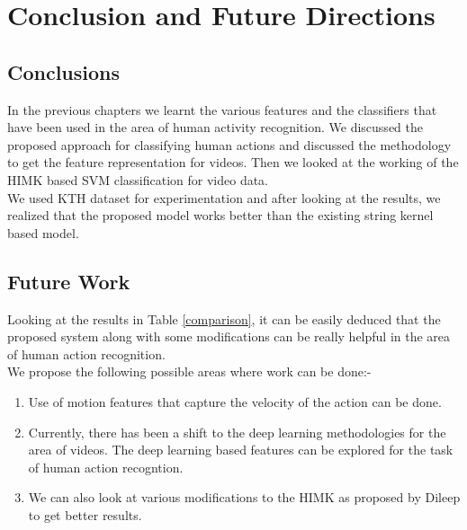 \chapter{Conclusion and Future Directions}\label{Conclusion}
\thispagestyle{empty}
\setlength{\parskip}{10pt plus 5pt minus 3pt}
\setlength{\parindent}{20pt}%

\section{Conclusions}
In the previous chapters we learnt the various features and the classifiers that have been used in the area of human activity recognition. We discussed the proposed approach for classifying human actions and discussed the methodology to get the feature representation for videos. Then we looked at the working of the HIMK based SVM classification for video data.\\
We used KTH dataset for experimentation and after looking at the results, we realized that the proposed model works better than the existing string kernel based model. 

\section{Future Work}
Looking at the results in Table \ref{comparison}, it can be easily deduced that the proposed system along with some modifications can be really helpful in the area of human action recognition.\\
We propose the following possible areas where work can be done:-
\begin{enumerate}
\item Use of motion features that capture the velocity of the action can be done.
\item Currently, there has been a shift to the deep learning methodologies for the area of videos. The deep learning based features can be explored for the task of human action recogntion.
\item We can also look at various modifications to the HIMK as proposed by Dileep to get better results.
\end{enumerate}

